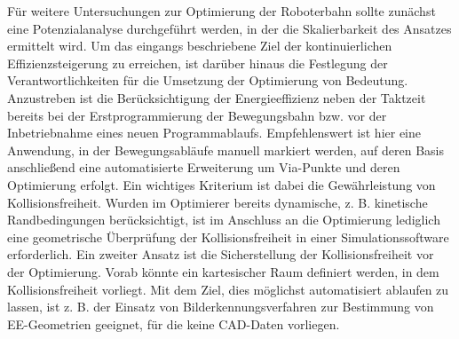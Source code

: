 Für weitere Untersuchungen zur Optimierung der Roboterbahn sollte zunächst eine Potenzialanalyse durchgeführt werden, in der die Skalierbarkeit des Ansatzes ermittelt wird. Um das eingangs beschriebene Ziel der kontinuierlichen Effizienzsteigerung zu erreichen, ist darüber hinaus die Festlegung der Verantwortlichkeiten für die Umsetzung der Optimierung von Bedeutung. Anzustreben ist die Berücksichtigung der Energieeffizienz neben der Taktzeit bereits bei der Erstprogrammierung der Bewegungsbahn bzw. vor der Inbetriebnahme eines neuen Programmablaufs. Empfehlenswert ist hier eine Anwendung, in der Bewegungsabläufe manuell markiert werden, auf deren Basis anschließend eine automatisierte Erweiterung um Via-Punkte und deren Optimierung erfolgt. Ein wichtiges Kriterium ist dabei die Gewährleistung von Kollisionsfreiheit. Wurden im Optimierer bereits dynamische, z. B. kinetische Randbedingungen berücksichtigt, ist im Anschluss an die Optimierung lediglich eine geometrische Überprüfung der Kollisionsfreiheit in einer Simulationssoftware erforderlich. Ein zweiter Ansatz ist die Sicherstellung der Kollisionsfreiheit vor der Optimierung. Vorab könnte ein kartesischer Raum definiert werden, in dem Kollisionsfreiheit vorliegt. Mit dem Ziel, dies möglichst automatisiert ablaufen zu lassen, ist z. B. der Einsatz von Bilderkennungsverfahren zur Bestimmung von EE-Geometrien geeignet, für die keine CAD-Daten vorliegen.




